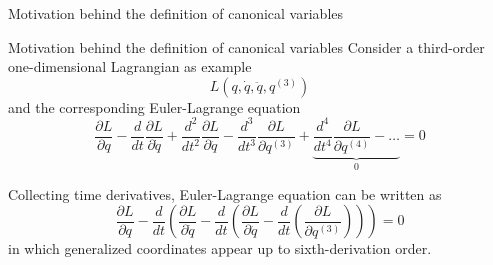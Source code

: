 \documentclass[10pt]{beamer}
\begin{document}
  \begin{frame}{Motivation behind the definition of canonical variables}
    \begin{alertblock}{Motivation behind the definition of canonical variables}
      \vspace{0.5em}
      Consider a third-order one-dimensional Lagrangian as example
      \begin{equation*}
        L\left( q, \dot{q}, \ddot{q}, q^{(3)} \right)
      \end{equation*}
      and the corresponding Euler-Lagrange equation
      \begin{equation*} \label{eq:third_order_euler_lagrangian}
        \frac{\partial L}{\partial q} -
        \frac{d}{dt}\frac{\partial L}{\partial \dot{q}} +
        \frac{d^2}{dt^2}\frac{\partial L}{\partial \ddot{q}} -
        \frac{d^3}{dt^3}\frac{\partial L}{\partial q^{(3)}} +
        \underbrace{
        \frac{d^4}{dt^4}\frac{\partial L}{\partial q^{(4)}} - \ldots }_0 = 0
      \end{equation*}

      Collecting time derivatives, Euler-Lagrange equation can be written as
      \begin{equation*} \label{eq:third_order_euler_lagrangian_with_parts}
        \frac{\partial L}{\partial q} -
        \frac{d}{dt} \left(
        \frac{\partial L}{\partial \dot{q}} -
        \frac{d}{dt} \left(
        \frac{\partial L}{\partial \ddot{q}} -
        \frac{d}{dt} \left(
        \frac{\partial L}{\partial q^{(3)}}
        \right)\right)\right) = 0
      \end{equation*}
      in which generalized coordinates appear up to sixth-derivation order.
    \end{alertblock}
  \end{frame}
\end{document}
